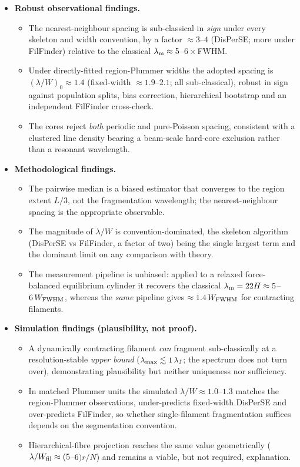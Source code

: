 \documentclass[usenatbib,twoside,twocolumn]{mnras}
\begin{document}
\begin{itemize}
    \item \textbf{Robust observational findings.}
    \begin{itemize}
        \item The nearest-neighbour spacing is sub-classical in \emph{sign} under every skeleton and width convention, by a factor $\approx3$--$4$ (DisPerSE; more under FilFinder) relative to the classical $\lambda_{\rm m}\approx5$--$6\times$FWHM.
        \item Under directly-fitted region-Plummer widths the adopted spacing is $(\lambda/W)_0\approx1.4$ (fixed-width $\approx1.9$--$2.1$; all sub-classical), robust in sign against population splits, bias correction, hierarchical bootstrap and an independent FilFinder cross-check.
        \item The cores reject \emph{both} periodic and pure-Poisson spacing, consistent with a clustered line density bearing a beam-scale hard-core exclusion rather than a resonant wavelength.
    \end{itemize}

    \item \textbf{Methodological findings.}
    \begin{itemize}
        \item The pairwise median is a biased estimator that converges to the region extent $L/3$, not the fragmentation wavelength; the nearest-neighbour spacing is the appropriate observable.
        \item The magnitude of $\lambda/W$ is convention-dominated, the skeleton algorithm (DisPerSE vs FilFinder, a factor of two) being the single largest term and the dominant limit on any comparison with theory.
        \item The measurement pipeline is unbiased: applied to a relaxed force-balanced equilibrium cylinder it recovers the classical $\lambda_{\rm m}=22H\approx5$--$6\,W_{\rm FWHM}$, whereas the \emph{same} pipeline gives $\approx1.4\,W_{\rm FWHM}$ for contracting filaments.
    \end{itemize}

    \item \textbf{Simulation findings (plausibility, not proof).}
    \begin{itemize}
        \item A dynamically contracting filament \emph{can} fragment sub-classically at a resolution-stable \emph{upper bound} ($\lambda_{\rm max}\lesssim1\,\lambda_{\rm J}$; the spectrum does not turn over), demonstrating plausibility but neither uniqueness nor sufficiency.
        \item In matched Plummer units the simulated $\lambda/W\approx1.0$--$1.3$ matches the region-Plummer observations, under-predicts fixed-width DisPerSE and over-predicts FilFinder, so whether single-filament fragmentation suffices depends on the segmentation convention.
        \item Hierarchical-fibre projection reaches the same value geometrically ($\lambda/W_{\rm fil}\approx(5$--$6)r/N$) and remains a viable, but not required, explanation.
    \end{itemize}


\end{itemize}
\end{document}
